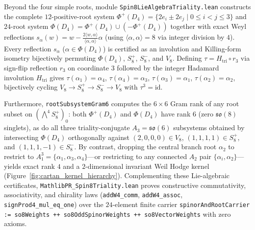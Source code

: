 \documentclass[11pt,a4paper]{article}
\begin{document}
Beyond the four simple roots, module \texttt{Spin8LieAlgebraTriality.lean} constructs the complete $12$-positive-root system $\Phi^+(D_4) = \{2e_i \pm 2e_j \mid 0 \le i < j \le 3\}$ and $24$-root system $\Phi(D_4) = \Phi^+(D_4) \cup (-\Phi^+(D_4))$ together with exact Weyl reflections $s_\alpha(w) = w - \frac{2\langle w, \alpha \rangle}{\langle \alpha, \alpha \rangle}\alpha$ (using $\langle \alpha, \alpha \rangle = 8$ via integer division by $4$). Every reflection $s_\alpha$ ($\alpha \in \Phi(D_4)$) is certified as an involution and Killing-form isometry bijectively permuting $\Phi(D_4)$, $S^+_8$, $S^-_8$, and $V_8$. Defining $\tau = H_{\mathrm{tri}} \circ r_3$ via sign-flip reflection $r_3$ on coordinate $3$ followed by the integer Hadamard involution $H_{\mathrm{tri}}$ gives $\tau(\alpha_1) = \alpha_4$, $\tau(\alpha_4) = \alpha_3$, $\tau(\alpha_3) = \alpha_1$, $\tau(\alpha_2) = \alpha_2$, bijectively cycling $V_8 \to S^+_8 \to S^-_8 \to V_8$ with $\tau^3 = \mathrm{id}$.

Furthermore, \texttt{rootSubsystemGram6} computes the $6 \times 6$ Gram rank of any root subset on $(\bigwedge^4 S^+_8)_0$: both $\Phi^+(D_4)$ and $\Phi(D_4)$ have rank $6$ (zero $\mathfrak{so}(8)$ singlets), as do all three triality-conjugate $A_3 = \mathfrak{so}(6)$ subsystems obtained by intersecting $\Phi(D_4)$ orthogonally against $(2,0,0,0) \in V_8$, $(1,1,1,1) \in S^+_8$, and $(1,1,1,-1) \in S^-_8$. By contrast, dropping the central branch root $\alpha_2$ to restrict to $A_1^3 = \{\alpha_1, \alpha_3, \alpha_4\}$---or restricting to any connected $A_2$ pair $\{\alpha_i, \alpha_2\}$---yields exact rank $4$ and a $2$-dimensional invariant Weil Hodge kernel (Figure~\ref{fig:cartan_kernel_hierarchy}). Complementing these Lie-algebraic certificates, \texttt{MathlibPR\_Spin8Triality.lean} proves constructive commutativity, associativity, and chirality laws (\texttt{addW4\_comm}, \texttt{addW4\_assoc}, \texttt{signProd4\_mul\_eq\_one}) over the $24$-element finite carrier \texttt{spinorAndRootCarrier := so8Weights ++ so8OddSpinorWeights ++ so8VectorWeights} with zero axioms.
\end{document}
